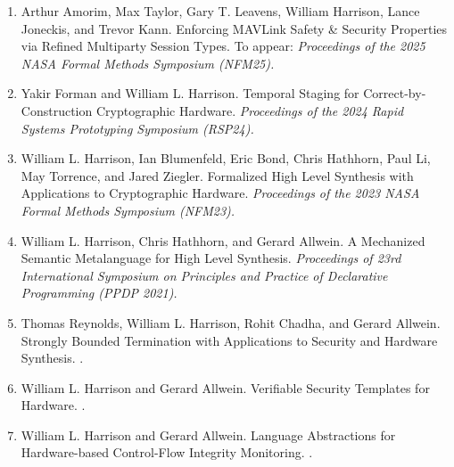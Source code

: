 \documentclass[12pt]{article} %
\begin{document}
\begin{enumerate}[leftmargin=0.0mm]

\item Arthur Amorim, Max Taylor, Gary T. Leavens, William Harrison, Lance Joneckis, and Trevor Kann.
\newblock Enforcing MAVLink Safety \& Security Properties via Refined Multiparty Session Types.
\newblock To appear: \emph{Proceedings of the 2025 NASA Formal Methods Symposium (NFM25).}

\item Yakir Forman and William L.  Harrison.
\newblock Temporal Staging for Correct-by-Construction Cryptographic Hardware.
\newblock \emph{Proceedings of the 2024 Rapid Systems Prototyping Symposium (RSP24).}


\item William L.  Harrison, Ian Blumenfeld, Eric Bond, Chris Hathhorn, Paul Li, May Torrence, and Jared Ziegler.
\newblock Formalized High Level Synthesis with Applications to Cryptographic Hardware.
\newblock \emph{Proceedings of the 2023 NASA Formal Methods Symposium (NFM23).}

\item William L.  Harrison, Chris Hathhorn, and Gerard Allwein.
\newblock A Mechanized Semantic Metalanguage for High Level Synthesis.  
\newblock \emph{Proceedings of 23rd International Symposium on Principles and Practice of Declarative Programming (PPDP 2021).}


\item
Thomas Reynolds, William L. Harrison, Rohit Chadha, and Gerard Allwein.
\newblock Strongly Bounded Termination with Applications to Security and Hardware Synthesis.
.

\item 
William L. Harrison and Gerard Allwein.
\newblock Verifiable Security Templates for Hardware.
. 

\item 
William L. Harrison and Gerard Allwein.
\newblock Language Abstractions for Hardware-based Control-Flow Integrity Monitoring.
.


\end{enumerate}
\end{document}
